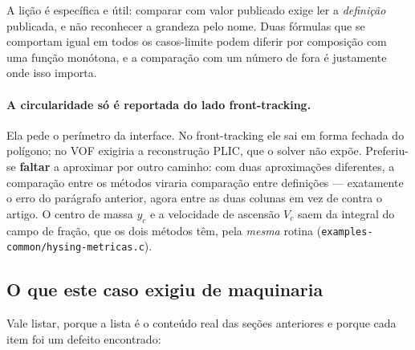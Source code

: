 A li\c{c}\~ao \'e espec\'ifica e \'util: comparar com valor publicado exige ler a
\emph{defini\c{c}\~ao} publicada, e n\~ao reconhecer a grandeza pelo nome. Duas
f\'ormulas que se comportam igual em todos os casos-limite podem diferir por
composi\c{c}\~ao com uma fun\c{c}\~ao mon\'otona, e a compara\c{c}\~ao com um
n\'umero de fora \'e justamente onde isso importa.

\paragraph{A circularidade s\'o \'e reportada do lado front-tracking.} Ela pede o
per\'imetro da interface. No front-tracking ele sai em forma fechada do
pol\'igono; no VOF exigiria a reconstru\c{c}\~ao PLIC, que o solver n\~ao
exp\~oe. Preferiu-se \textbf{faltar} a aproximar por outro caminho: com duas
aproxima\c{c}\~oes diferentes, a compara\c{c}\~ao entre os m\'etodos viraria
compara\c{c}\~ao entre defini\c{c}\~oes --- exatamente o erro do par\'agrafo
anterior, agora entre as duas colunas em vez de contra o artigo. O centro de
massa $y_c$ e a velocidade de ascens\~ao $V_c$ saem da integral do campo de
fra\c{c}\~ao, que os dois m\'etodos t\^em, pela \emph{mesma} rotina
(\texttt{examples-\allowbreak{}common/\allowbreak{}hysing-\allowbreak{}metricas.\allowbreak{}c}).

\subsection{O que este caso exigiu de maquinaria}

Vale listar, porque a lista \'e o conte\'udo real das se\c{c}\~oes anteriores e
porque cada item foi um defeito encontrado:

